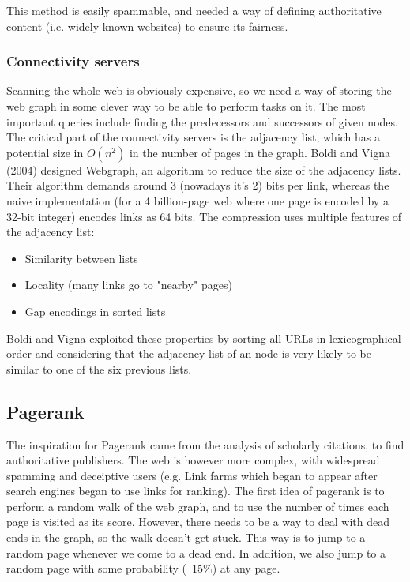 This method is easily spammable, and needed a way of defining authoritative content (i.e. widely known websites) to ensure its fairness.

\subsubsection{Connectivity servers}

Scanning the whole web is obviously expensive, so we need a way of storing the web graph in some clever way to be able to perform tasks on it.
The most important queries include finding the predecessors and successors of given nodes.
The critical part of the connectivity servers is the adjacency list, which has a potential size in $O(n^2)$ in the number of pages in the graph.
Boldi and Vigna (2004) designed Webgraph, an algorithm to reduce the size of the adjacency lists. Their algorithm demands around 3 (nowadays it's 2) bits per link, whereas the naive implementation (for a 4 billion-page web where one page is encoded by a 32-bit integer) encodes links as 64 bits.
The compression uses multiple features of the adjacency list:
\begin{itemize}
\item Similarity between lists
\item Locality (many links go to "nearby" pages)
\item Gap encodings in sorted lists
\end{itemize}
Boldi and Vigna exploited these properties by sorting all URLs in lexicographical order and considering that the adjacency list of an node is very likely to be similar to one of the six previous lists.

\subsection{Pagerank}

The inspiration for Pagerank came from the analysis of scholarly citations, to find authoritative publishers. The web is however more complex, with widespread spamming and deceiptive users (e.g. Link farms which began to appear after search engines began to use links for ranking).
The first idea of pagerank is to perform a random walk of the web graph, and to use the number of times each page is visited as its score. However, there needs to be a way to deal with dead ends in the graph, so the walk doesn't get stuck.
This way is to jump to a random page whenever we come to a dead end. In addition, we also jump to a random page with some probability (~15\%) at any page.

